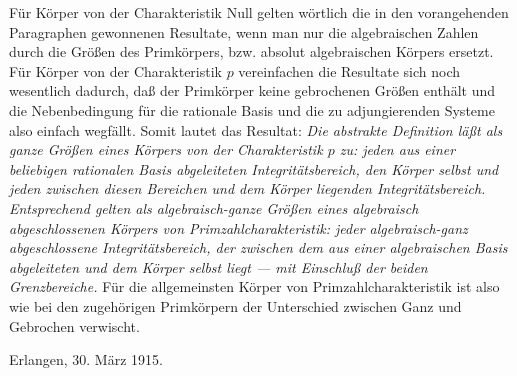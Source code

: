 Für Körper von der Charakteristik Null gelten wörtlich die in den vorangehenden
Paragraphen gewonnenen Resultate, wenn man nur die \glqq{}algebraischen Zahlen\grqq{} durch
die Größen des Primkörpers, bzw. absolut algebraischen Körpers ersetzt. Für
Körper von der Charakteristik $p$ vereinfachen die Resultate sich noch
wesentlich dadurch, daß der Primkörper keine gebrochenen Größen enthält und die
Nebenbedingung für die rationale Basis und die zu adjungierenden Systeme also
einfach wegfällt.
Somit lautet das Resultat: \emph{Die abstrakte Definition läßt als ganze Größen
eines Körpers von der Charakteristik $p$ zu: jeden aus einer beliebigen
rationalen Basis abgeleiteten Integritätsbereich, den Körper selbst und jeden
zwischen diesen Bereichen und dem Körper liegenden Integritätsbereich.
Entsprechend gelten als algebraisch-ganze Größen eines algebraisch
abgeschlossenen Körpers von Primzahlcharakteristik: jeder algebraisch-ganz
abgeschlossene Integritätsbereich, der zwischen dem aus einer algebraischen Basis
abgeleiteten und dem Körper selbst liegt --- mit Einschluß der beiden
Grenzbereiche.} Für die allgemeinsten Körper von Primzahlcharakteristik ist also
wie bei den zugehörigen Primkörpern der Unterschied zwischen Ganz und Gebrochen
verwischt.

\medskip
\noindent Erlangen, 30. März 1915.

\clearpage
\setcounter{footnote}{0}

